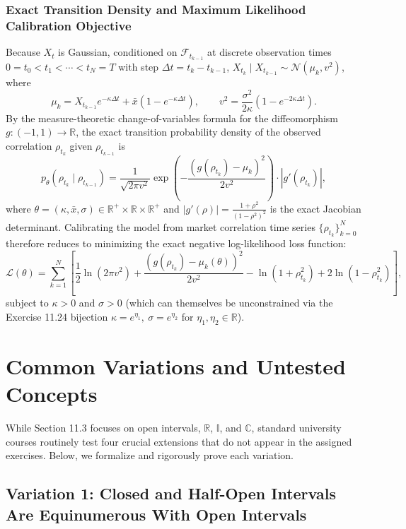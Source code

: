 \documentclass[11pt, letterpaper]{article}
\theoremstyle{definition}
\theoremstyle{remark}
\begin{document}
\subsubsection{Exact Transition Density and Maximum Likelihood Calibration Objective}
Because $X_t$ is Gaussian, conditioned on $\mathcal{F}_{t_{k-1}}$ at discrete observation times $0 = t_0 < t_1 < \cdots < t_N = T$ with step $\Delta t = t_k - t_{k-1}$, $X_{t_k} \mid X_{t_{k-1}} \sim \mathcal{N}(\mu_k, v^2)$, where
\[
\mu_k = X_{t_{k-1}} e^{-\kappa \Delta t} + \bar{x}\left(1 - e^{-\kappa \Delta t}\right), \qquad v^2 = \frac{\sigma^2}{2\kappa}\left(1 - e^{-2\kappa \Delta t}\right).
\]
By the measure-theoretic change-of-variables formula for the diffeomorphism $g : (-1, 1) \to \mathbb{R}$, the exact transition probability density of the observed correlation $\rho_{t_k}$ given $\rho_{t_{k-1}}$ is
\[
p_\theta\left(\rho_{t_k} \mid \rho_{t_{k-1}}\right) = \frac{1}{\sqrt{2\pi v^2}} \exp\left(-\frac{\left(g(\rho_{t_k}) - \mu_k\right)^2}{2v^2}\right) \cdot \left|g'(\rho_{t_k})\right|,
\]
where $\theta = (\kappa, \bar{x}, \sigma) \in \mathbb{R}^+ \times \mathbb{R} \times \mathbb{R}^+$ and $\left|g'(\rho)\right| = \frac{1 + \rho^2}{(1 - \rho^2)^2}$ is the exact Jacobian determinant. Calibrating the model from market correlation time series $\{\rho_{t_k}\}_{k=0}^N$ therefore reduces to minimizing the exact negative log-likelihood loss function:
\[
\mathcal{L}(\theta) = \sum_{k=1}^{N} \left[\frac{1}{2}\ln\left(2\pi v^2\right) + \frac{\left(g(\rho_{t_k}) - \mu_k(\theta)\right)^2}{2v^2} - \ln\left(1 + \rho_{t_k}^2\right) + 2\ln\left(1 - \rho_{t_k}^2\right)\right],
\]
subject to $\kappa > 0$ and $\sigma > 0$ (which can themselves be unconstrained via the Exercise 11.24 bijection $\kappa = e^{\eta_1},\ \sigma = e^{\eta_2}$ for $\eta_1, \eta_2 \in \mathbb{R}$).

\section{Common Variations and Untested Concepts}

While Section 11.3 focuses on open intervals, $\mathbb{R}$, $\mathbb{I}$, and $\mathbb{C}$, standard university courses routinely test four crucial extensions that do not appear in the assigned exercises. Below, we formalize and rigorously prove each variation.

\subsection{Variation 1: Closed and Half-Open Intervals Are Equinumerous With Open Intervals}
\end{document}
